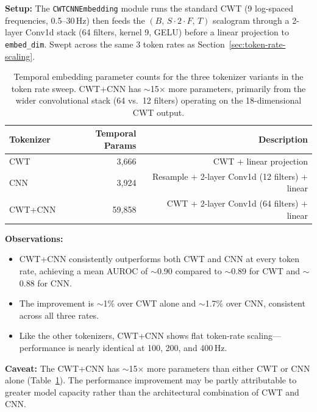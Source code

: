 \documentclass[11pt, a4paper]{article}
\begin{document}
\textbf{Setup:} The \texttt{CWTCNNEmbedding} module runs the standard
CWT (9 log-spaced frequencies, 0.5--30\,Hz) then feeds the
$(B,\, S {\cdot} 2 {\cdot} F,\, T)$ scalogram through a 2-layer
Conv1d stack (64 filters, kernel 9, GELU) before a linear projection
to \texttt{embed\_dim}. Swept across the same 3 token rates as
Section~\ref{sec:token-rate-scaling}.

\begin{table}[H]
      \centering
      \begin{tabular}{lrr}
            \toprule
            \textbf{Tokenizer} & \textbf{Temporal Params} & \textbf{Description}          \\
            \midrule
            CWT                & 3{,}666                  & CWT + linear projection       \\
            CNN                & 3{,}924                  & Resample + 2-layer Conv1d (12 filters) + linear \\
            CWT+CNN            & 59{,}858                 & CWT + 2-layer Conv1d (64 filters) + linear       \\
            \bottomrule
      \end{tabular}
      \caption{Temporal embedding parameter counts for the three
            tokenizer variants in the token rate sweep. CWT+CNN has
            $\sim$15$\times$ more parameters, primarily from the wider
            convolutional stack (64 vs.\ 12 filters) operating on the
            18-dimensional CWT output.}
      \label{tab:tokenizer-params}
\end{table}

\textbf{Observations:}
\begin{itemize}[nosep]
      \item CWT+CNN consistently outperforms both CWT and CNN at every
            token rate, achieving a mean AUROC of $\sim$0.90 compared
            to $\sim$0.89 for CWT and $\sim$0.88 for CNN.
      \item The improvement is $\sim$1\% over CWT alone and
            $\sim$1.7\% over CNN, consistent across all three rates.
      \item Like the other tokenizers, CWT+CNN shows flat token-rate
            scaling---performance is nearly identical at 100, 200, and
            400\,Hz.
\end{itemize}

\textbf{Caveat:} The CWT+CNN has $\sim$15$\times$ more parameters
than either CWT or CNN alone (Table~\ref{tab:tokenizer-params}). The
performance improvement may be partly attributable to greater model
capacity rather than the architectural combination of CWT and CNN.
\end{document}
